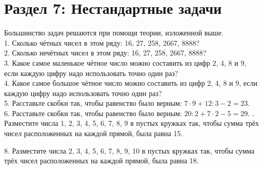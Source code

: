 \documentclass[12pt]{article}
\begin{document}
\section{Раздел 7: Нестандартные задачи}
Большинство задач решаются при помощи теории, изложенной выше.\\
1. Сколько чётных чисел в этом ряду: 16, 27, 258, 2667, 8888?\\
2. Сколько нечётных чисел в этом ряду: 16, 27, 258, 2667, 8888?\\
3. Какое самое маленькое чётное число можно составить из цифр 2, 4, 8 и 9, если каждую цифру надо использовать точно один раз?\\
4. Какое самое большое чётное число можно составить из цифр 2, 4, 8 и 9, если каждую цифру надо использовать точно один раз?\\
5. Расставьте скобки так, чтобы равенство было верным: $7\cdot9+12:3-2=23.$\\
6. Расставьте скобки так, чтобы равенство было верным: $20:2+7\cdot2-5=29.$
\newpage
{}. Разместите числа 1, 2, 3, 4, 5, 6, 7, 8, 9 в пустых кружках так, чтобы сумма трёх чисел расположенных на каждой прямой, была равна 15.
\begin{center}
\begin{figure}[h!]
\end{figure}
\end{center}
8. Разместите числа 2, 3, 4, 5, 6, 7, 8, 9, 10 в пустых кружках так, чтобы сумма трёх чисел расположенных на каждой прямой, была равна 18.
\end{document}
